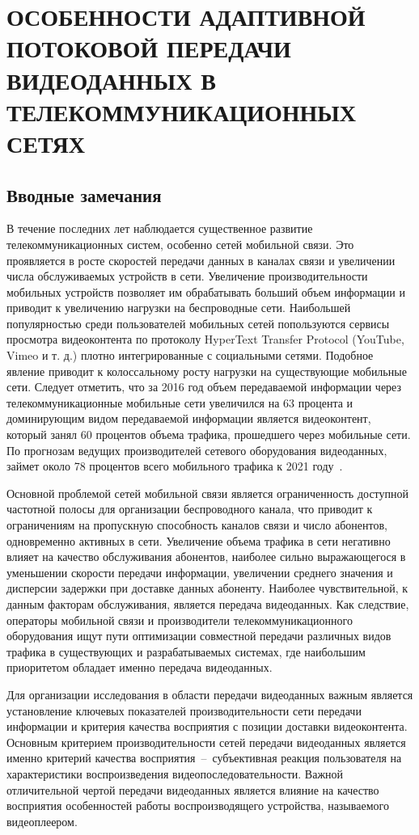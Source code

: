 \newpage
\chapter{ОСОБЕННОСТИ АДАПТИВНОЙ ПОТОКОВОЙ ПЕРЕДАЧИ ВИДЕОДАННЫХ В ТЕЛЕКОММУНИКАЦИОННЫХ СЕТЯХ}
\label{chap1}

\section{Вводные замечания}

В течение последних лет наблюдается существенное развитие телекоммуникационных систем, особенно сетей мобильной связи. Это проявляется в росте скоростей передачи данных в каналах связи и увеличении числа обслуживаемых устройств в сети. Увеличение производительности мобильных устройств позволяет им обрабатывать больший объем информации и приводит к увеличению нагрузки на беспроводные сети. Наибольшей популярностью среди пользователей мобильных сетей попользуются сервисы просмотра видеоконтента по протоколу HyperText Transfer Protocol (YouTube, Vimeo и т. д.) плотно интегрированные с социальными сетями. Подобное явление приводит к колоссальному росту нагрузки на существующие мобильные сети. Следует отметить, что за 2016 год объем передаваемой информации через телекоммуникационные мобильные сети увеличился на 63 процента и доминирующим видом передаваемой информации является видеоконтент, который занял 60 процентов объема трафика, прошедшего через мобильные сети. По прогнозам ведущих производителей сетевого оборудования видеоданных, займет около 78 процентов всего мобильного трафика к 2021 году~\cite{Cisco}.

Основной проблемой сетей мобильной связи является ограниченность доступной частотной полосы для организации беспроводного канала, что приводит к ограничениям на пропускную способность каналов связи и число абонентов, одновременно активных в сети. Увеличение объема трафика в сети негативно влияет на качество обслуживания абонентов, наиболее сильно выражающегося в уменьшении скорости передачи информации, увеличении среднего значения и дисперсии задержки при доставке данных абоненту. Наиболее чувствительной, к данным факторам обслуживания, является передача видеоданных. Как следствие, операторы мобильной связи и производители телекоммуникационного оборудования ищут пути оптимизации совместной передачи различных видов трафика в существующих и разрабатываемых системах, где наибольшим приоритетом обладает именно передача видеоданных.

Для организации исследования в области передачи видеоданных важным является установление ключевых показателей производительности сети передачи информации и критерия качества восприятия с позиции доставки видеоконтента. Основным критерием производительности сетей передачи видеоданных является именно критерий качества восприятия~--~субъективная реакция пользователя на характеристики воспроизведения видеопоследовательности. Важной отличительной чертой передачи видеоданных является влияние на качество восприятия особенностей работы воспроизводящего устройства, называемого видеоплеером.

